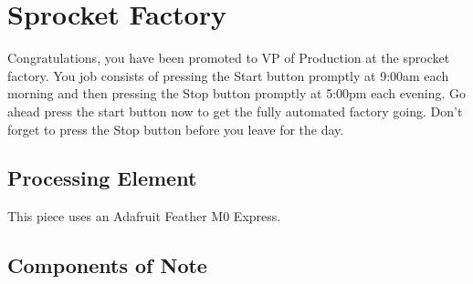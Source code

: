 %
%
%
%
% 
%
%
%
%
%
% 
%

\section{Sprocket Factory}

Congratulations, you have been promoted to VP of Production at the sprocket
factory. You job consists of pressing the Start button promptly at 9:00am each
morning and then pressing the Stop button promptly at 5:00pm each evening. Go
ahead press the start button now to get the fully automated factory going.
Don't forget to press the Stop button before you leave for the day.

\subsection*{Processing Element}

This piece uses an Adafruit Feather M0 Express.

\subsection*{Components of Note}

